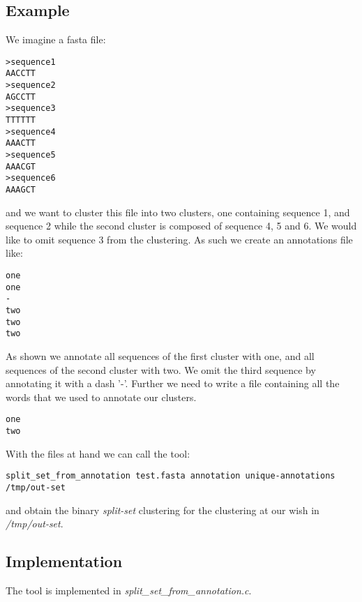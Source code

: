 \subsection{Example}
We imagine a fasta file:
\begin{lstlisting}
>sequence1
AACCTT
>sequence2
AGCCTT
>sequence3
TTTTTT
>sequence4
AAACTT
>sequence5
AAACGT
>sequence6
AAAGCT
\end{lstlisting}
and we want to cluster this file into two clusters, one containing
sequence 1, and sequence 2 while the second cluster is composed of
sequence 4, 5 and 6. We would like to omit sequence 3 from the
clustering. As such we create an annotations file like:
\begin{lstlisting}
one
one
-
two
two
two
\end{lstlisting}
As shown we annotate all sequences of the first cluster with one, and
all sequences of the second cluster with two. We omit the third
sequence by annotating it with a dash '-'. Further we need to write a
file containing all the words that we used to annotate our clusters.
\begin{lstlisting}
one
two
\end{lstlisting}
With the files at hand we can call the tool:
\begin{lstlisting}
split_set_from_annotation test.fasta annotation unique-annotations /tmp/out-set
\end{lstlisting}
and obtain the binary \emph{split-set} clustering for the clustering
at our wish in \emph{/tmp/out-set}.

\subsection{Implementation}
The tool is implemented in \emph{split\_set\_from\_annotation.c}.
